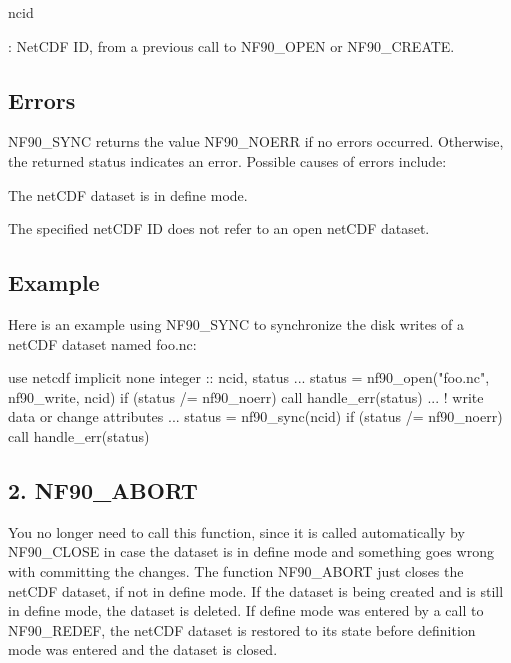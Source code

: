 {\ttfamily ncid}

\+: Net\+C\+DF ID, from a previous call to N\+F90\+\_\+\+O\+P\+EN or N\+F90\+\_\+\+C\+R\+E\+A\+TE.

\subsection*{Errors}

N\+F90\+\_\+\+S\+Y\+NC returns the value N\+F90\+\_\+\+N\+O\+E\+RR if no errors occurred. Otherwise, the returned status indicates an error. Possible causes of errors include\+:


\begin{DoxyItemize}
\item The net\+C\+DF dataset is in define mode.
\item The specified net\+C\+DF ID does not refer to an open net\+C\+DF dataset.
\end{DoxyItemize}

\subsection*{Example}

Here is an example using N\+F90\+\_\+\+S\+Y\+NC to synchronize the disk writes of a net\+C\+DF dataset named foo.\+nc\+:


\begin{DoxyCode}
\textcolor{keywordtype}{use }netcdf
\textcolor{keywordtype}{implicit none}
\textcolor{keywordtype}{integer} :: ncid, status
...
status = nf90\_open(\textcolor{stringliteral}{"foo.nc"}, nf90\_write, ncid)
\textcolor{keywordflow}{if} (status /= nf90\_noerr) \textcolor{keyword}{call }handle\_err(status)
...  
\textcolor{comment}{! write data or change attributes}
...  
status = nf90\_sync(ncid)
\textcolor{keywordflow}{if} (status /= nf90\_noerr) \textcolor{keyword}{call }handle\_err(status)
\end{DoxyCode}
\hypertarget{f90_datasets_f90-nf90_abort}{}\subsection{2. N\+F90\+\_\+\+A\+B\+O\+R\+T }\label{f90_datasets_f90-nf90_abort}
You no longer need to call this function, since it is called automatically by N\+F90\+\_\+\+C\+L\+O\+SE in case the dataset is in define mode and something goes wrong with committing the changes. The function N\+F90\+\_\+\+A\+B\+O\+RT just closes the net\+C\+DF dataset, if not in define mode. If the dataset is being created and is still in define mode, the dataset is deleted. If define mode was entered by a call to N\+F90\+\_\+\+R\+E\+D\+EF, the net\+C\+DF dataset is restored to its state before definition mode was entered and the dataset is closed.


